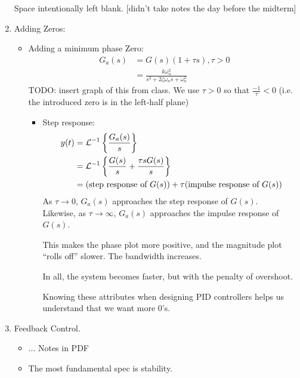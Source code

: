 \begin{enumerate}
    Space intentionally left blank. [didn't take notes the day before the midterm]
    \item Adding Zeros:
        \begin{itemize}
            \item Adding a minimum phase Zero:
                \begin{align*}
                    G_a(s) &= G(s) (1 + \tau s), \tau > 0 \\
                    &= \frac{k \omega_n^2}{s^2 + 2 \zeta \omega_n s + \omega_n^2}
                \end{align*}
                TODO: insert graph of this from class.
                We use $\tau > 0$ so that $\frac{-1}{\tau}<0$ (i.e. the introduced zero is in the left-half plane)
                \begin{itemize}
                    \item Step response:
                        \begin{align*}
                            y(t) &= \mathcal{L}^{-1} \left\{ \frac{G_a(s)}{s} \right\} \\
                            &= \mathcal{L}^{-1} \left\{ \frac{G(s)}{s} + \frac{\tau s G(s)}{s} \right\} \\
                            &= (\text{step response of $G(s)$} ) + \tau(\text{impulse response of $G(s)$})
                        \end{align*}
                        As $\tau \rightarrow 0$, $G_a(s)$ approaches the step response of $G(s)$. \\
                        Likewise, as $\tau \rightarrow \infty$, $G_a(s)$ approaches the impulse response of $G(s)$.

                        This makes the phase plot more positive, and the magnitude plot ``rolls off'' slower. The bandwidth increases.

                        In all, the system becomes faster, but with the penalty of overshoot.

                        Knowing these attributes when designing PID controllers helps us understand that we want more 0's.
                \end{itemize}

        \end{itemize}
    \item  Feedback Control.

            \begin{itemize}
                \item ... Notes in PDF
                \item The most fundamental spec is stability.


\end{itemize}
\end{enumerate}
